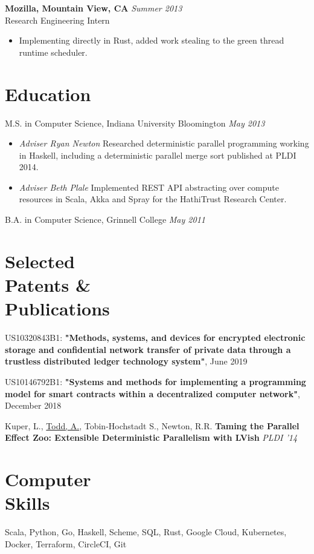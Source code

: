 \documentclass[margin]{res}
\begin{document}
\begin{resume}
 {\bf Mozilla, Mountain View, CA} \hfill \textit{Summer 2013} \\
 Research Engineering Intern
 \begin{itemize} \itemsep -2pt  %
 \item Implementing directly in Rust, added work stealing to the green thread runtime scheduler.
 \end{itemize}
 
\section{Education}

M.S. in Computer Science, Indiana University Bloomington \hfill \textit{May 2013}
 \begin{itemize} \itemsep -2pt
 \item {\it Adviser Ryan Newton} Researched deterministic parallel programming working in Haskell, including a deterministic parallel merge sort published at PLDI 2014.
 \item {\it Adviser Beth Plale} Implemented REST API abstracting over compute resources in Scala, Akka and Spray for the HathiTrust Research Center.
 \end{itemize}
  B.A. in Computer Science, Grinnell College \hfill \textit{May 2011}
 
\section{Selected \\ Patents \& \\ Publications}

US10320843B1: {\bf "Methods, systems, and devices for encrypted electronic storage and confidential network transfer of private data through a trustless distributed ledger technology system"}, June 2019

US10146792B1: {\bf "Systems and methods for implementing a programming model for smart contracts within a decentralized computer network"}, December 2018

Kuper, L., \underline{Todd, A.}, Tobin-Hochstadt S., Newton, R.R. {\bf Taming the Parallel Effect Zoo: Extensible Deterministic Parallelism with LVish} \textit{PLDI '14} 

\section{Computer \\ Skills}
Scala, Python, Go, Haskell, Scheme, SQL, Rust, Google Cloud, Kubernetes, Docker, Terraform, CircleCI, Git
\end{resume} 
\end{document}
